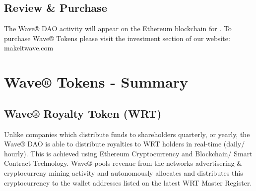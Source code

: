 \documentclass[letterpaper,10pt,openany,oneside,english]{sphinxmanual}
\begin{document}
\section{Review \& Purchase}
\label{\detokenize{introduction:review-purchase}}
The Wave® DAO activity will appear on the Ethereum blockchain for .
To purchase Wave® Tokens please visit the investment section of our website: makeitwave.com


\chapter{Wave® Tokens - Summary}
\label{\detokenize{investors:wave-tokens-summary}}\label{\detokenize{investors::doc}}

\section{Wave® Royalty Token (WRT)}
\label{\detokenize{investors:wave-royalty-token-wrt}}
Unlike companies which distribute funds to shareholders quarterly, or yearly, the Wave® DAO is able to distribute royalties to WRT holders in real-time (daily/ hourly).
This is achieved using Ethereum Cryptocurrency and Blockchain/ Smart Contract Technology.
Wave® pools revenue from the networks advertisering \& cryptocurreny mining activity and autonomously allocates and distributes this cryptocurrency to the wallet addresses listed on the latest WRT Master Register.
\end{document}
